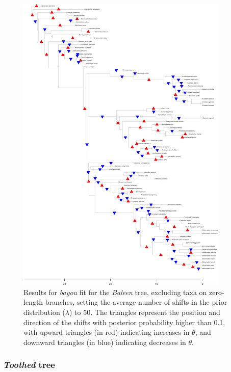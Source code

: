 \begin{figure}[H]
\includegraphics[width=0.9\textwidth]{img/plots-baleen-k50-1.pdf}
\caption{Results for \textit{bayou} fit for the \textit{Baleen} tree, excluding taxa on zero-length branches, setting the average number of shifts in the prior distribution ($\lambda$) to 50. The triangles represent the position and direction of the shifts with posterior probability higher than 0.1, with upward triangles (in red) indicating increases in $\theta$, and downward triangles (in blue) indicating decreases in $\theta$.}
\label{fig:baleen-k50-nzlb}
\end{figure}

\newpage
\subsubsection{\textit{Toothed} tree}

